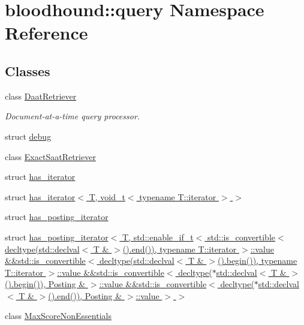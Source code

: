 \hypertarget{namespacebloodhound_1_1query}{}\section{bloodhound\+:\+:query Namespace Reference}
\label{namespacebloodhound_1_1query}
\subsection*{Classes}
\begin{DoxyCompactItemize}
\item 
class \hyperlink{classbloodhound_1_1query_1_1DaatRetriever}{Daat\+Retriever}
\begin{DoxyCompactList}\small\item\em Document-\/at-\/a-\/time query processor. \end{DoxyCompactList}\item 
struct \hyperlink{structbloodhound_1_1query_1_1debug}{debug}
\item 
class \hyperlink{classbloodhound_1_1query_1_1ExactSaatRetriever}{Exact\+Saat\+Retriever}
\item 
struct \hyperlink{structbloodhound_1_1query_1_1has__iterator}{has\+\_\+iterator}
\item 
struct \hyperlink{structbloodhound_1_1query_1_1has__iterator_3_01T_00_01void__t_3_01typename_01T_1_1iterator_01_4_01_4}{has\+\_\+iterator$<$ T, void\+\_\+t$<$ typename T\+::iterator $>$ $>$}
\item 
struct \hyperlink{structbloodhound_1_1query_1_1has__posting__iterator}{has\+\_\+posting\+\_\+iterator}
\item 
struct \hyperlink{structbloodhound_1_1query_1_1has__posting__iterator_3_01T_00_01std_1_1enable__if__t_3_01std_1_1i3aad327a30d60305d06d5c73680c1a38}{has\+\_\+posting\+\_\+iterator$<$ T, std\+::enable\+\_\+if\+\_\+t$<$ std\+::is\+\_\+convertible$<$ decltype(std\+::declval$<$ T \& $>$().\+end()), typename T\+::iterator $>$\+::value \&\&std\+::is\+\_\+convertible$<$ decltype(std\+::declval$<$ T \& $>$().\+begin()), typename T\+::iterator $>$\+::value \&\&std\+::is\+\_\+convertible$<$ decltype($\ast$std\+::declval$<$ T \& $>$().\+begin()), Posting \& $>$\+::value \&\&std\+::is\+\_\+convertible$<$ decltype($\ast$std\+::declval$<$ T \& $>$().\+end()), Posting \& $>$\+::value $>$ $>$}
\item 
class \hyperlink{classbloodhound_1_1query_1_1MaxScoreNonEssentials}{Max\+Score\+Non\+Essentials}
\item 

\end{DoxyCompactItemize}
